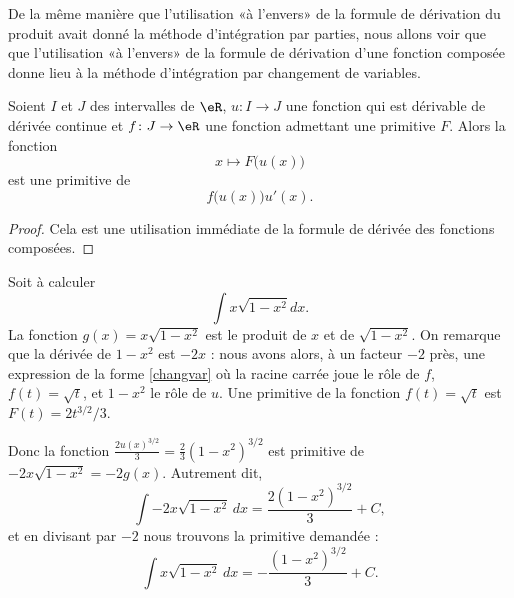 De la même manière que l'utilisation «à l'envers» de la formule de dérivation du produit avait donné la méthode d'intégration par parties, nous allons voir que que l'utilisation «à l'envers» de la formule de dérivation d'une fonction composée donne lieu à la méthode d'intégration par changement de variables.
\begin{proposition}
    Soient \( I\) et \( J\) des intervalles de \( \eR\), \( u\colon I\to J\) une fonction qui est dérivable de dérivée continue et \( f\colon J\to \eR\) une fonction admettant une primitive \( F\). Alors la fonction
    \begin{equation}
        x\mapsto F\big( u(x) \big)
    \end{equation}
    est une primitive de
    \begin{equation}\label{changvar}
        f\big( u(x) \big)u'(x).
    \end{equation}
\end{proposition}

\begin{proof}
    Cela est une utilisation immédiate de la formule de dérivée des fonctions composées.
\end{proof}

\begin{example}
    Soit à calculer
    \begin{equation}
        \int x\sqrt{1-x^2}dx.
    \end{equation}
La fonction $g(x) = x\sqrt{1-x^2}$ est le produit de $x$ et de $\sqrt{1-x^2}$. On remarque que la dérivée de $1-x^2$ est $-2x$ : nous avons alors, à un facteur $-2$ près, une expression de la forme \eqref{changvar} où la racine carrée joue le r\^ole de $f$, \( f(t)=\sqrt{t}\),   et $1-x^2$ le r\^ole de $u$.  Une primitive de la fonction \( f(t)=\sqrt{t}\) est $F(t) = 2t^{3/2}/3$.

    Donc la fonction
      $  \frac{ 2u(x)^{3/2} }{ 3 }=\frac{ 2 }{ 3 }(1-x^2)^{3/2}$
    est primitive de
     $   -2x\sqrt{1-x^2} = -2 g(x)$.
    Autrement dit,
    \begin{equation}
        \int -2x\sqrt{1-x^2}\,dx=\frac{ 2 (1-x^2)^{3/2}}{ 3 } + C,
    \end{equation}
    et en divisant par \( -2\) nous trouvons la primitive demandée :
    \begin{equation}
        \int x\sqrt{1-x^2}\,dx=-\frac{ (1-x^2)^{3/2} }{ 3 } + C.
    \end{equation}
\end{example}

